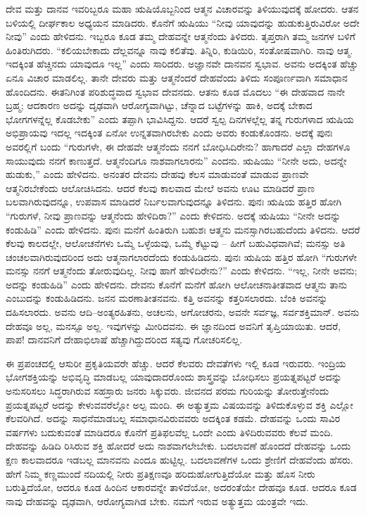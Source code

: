 ದೇವ ಮತ್ತು ದಾನವ ಇವರಿಬ್ಬರೂ ಮಹಾ ಋಷಿಯೊಬ್ಬನಿಂದ ಆತ್ಮನ ವಿಚಾರವನ್ನು ತಿಳಿಯುವುದಕ್ಕೆ ಹೋದರು. ಆತನ ಬಳಿಯಲ್ಲಿ ದೀರ್ಘಕಾಲ ಅಧ್ಯಯನ ಮಾಡಿದರು. ಕೊನೆಗೆ ಋಷಿಯು “ನೀವು ಯಾವುದನ್ನು ಹುಡುಕುತ್ತಿರುವಿರೋ ಅದೇ ನೀವು” ಎಂದು ಹೇಳಿದನು. ಇಬ್ಬರೂ ಕೂಡ ತಮ್ಮ ದೇಹವನ್ನೇ ಆತ್ಮನೆಂದು ತಿಳಿದರು. ತೃಪ್ತರಾಗಿ ತಮ್ಮ ಜನಗಳ ಬಳಿಗೆ ಹಿಂತಿರುಗಿದರು. “ಕಲಿಯಬೇಕಾದು ದೆಲ್ಲವನ್ನೂ ನಾವು ಕಲಿತೆವು. ತಿನ್ನಿರಿ, ಕುಡಿಯಿರಿ, ಸಂತೋಷವಾಗಿರಿ. ನಾವು ಆತ್ಮ. ಇದಕ್ಕಿಂತ ಹೆಚ್ಚಿನದು ಯಾವುದೂ ಇಲ್ಲ” ಎಂದು ಸಾರಿದರು. ಅಜ್ಞಾನವೇ ದಾನವನ ಸ್ವಭಾವ. ಅವನು ಅದಕ್ಕಿಂತ ಹೆಚ್ಚು ಏನೂ ವಿಚಾರ ಮಾಡಲಿಲ್ಲ. ತಾನೇ ದೇವರು ಮತ್ತು ಆತ್ಮನೆಂದರೆ ದೇಹವೆಂದು ತಿಳಿದು ಸಂಪೂರ್ಣವಾಗಿ ಸಮಾಧಾನ ಹೊಂದಿದನು. ಈತನಿಗಿಂತ ಪರಿಶುದ್ಧವಾದ ಸ್ವಭಾವ ದೇವನದು. ಆತನು ಕೂಡ ಮೊದಲು “ಈ ದೇಹವಾದ ನಾನೇ ಬ್ರಹ್ಮ; ಆದಕಾರಣ ಅದನ್ನು ದೃಢವಾಗಿ ಆರೋಗ್ಯವಾಗಿಟ್ಟು, ಚೆನ್ನಾದ ಬಟ್ಟೆಗಳನ್ನು ಹಾಕಿ, ಅದಕ್ಕೆ ಬೇಕಾದ ಭೋಗಗಳನ್ನೆಲ್ಲ ಕೊಡಬೇಕು” ಎಂದು ತಪ್ಪಾಗಿ ಭಾವಿಸಿದ್ದನು. ಆದರೆ ಸ್ವಲ್ಪ ದಿನಗಳಲ್ಲೆಲ್ಲ ತನ್ನ ಗುರುಗಳಾದ ಋಷಿಯ ಅಭಿಪ್ರಾಯವು ಇದಲ್ಲ ಇದಕ್ಕಿಂತ ಏನೋ ಉನ್ನತವಾಗಿರಬೇಕು ಎಂದು ಅವರು ಕಂಡುಕೊಂಡನು. ಅದಕ್ಕೆ ಪುನಃ ಅವರಲ್ಲಿಗೆ ಬಂದು “ಗುರುಗಳೇ, ಈ ದೇಹವೇ ಆತ್ಮನೆಂದು ನನಗೆ ಬೋಧಿಸಿದಿರೇನು? ಹಾಗಾದರೆ ಎಲ್ಲಾ ದೇಹಗಳೂ ಸಾಯುವುದು ನನಗೆ ಕಾಣುತ್ತದೆ. ಆತ್ಮನೆಂದಿಗೂ ನಾಶವಾಗಲಾರನು” ಎಂದನು. ಋಷಿಯು “ನೀನೇ ಅದು, ಅದನ್ನೇ ಹುಡುಕು,” ಎಂದು ಹೇಳಿದನು. ಅನಂತರ ದೇವನು ದೇಹವು ಕೆಲಸ ಮಾಡುವಂತೆ ಮಾಡುವ ಪ್ರಾಣವೇ ಆತ್ಮನಿರಬೇಕೆಂದು ಆಲೋಚಿಸಿದನು. ಆದರೆ ಕೆಲವು ಕಾಲವಾದ ಮೇಲೆ ಅವನು ಊಟ ಮಾಡಿದರೆ ಪ್ರಾಣ ಬಲವಾಗಿರುವುದನ್ನೂ, ಉಪವಾಸ ಮಾಡಿದರೆ ನಿರ್ಬಲವಾಗುವುದನ್ನೂ ತಿಳಿದನು. ಪುನಃ ಋಷಿಯ ಹತ್ತಿರ ಹೋಗಿ “ಗುರುಗಳೆ, ನೀವು ಪ್ರಾಣವನ್ನು ಆತ್ಮನೆಂದು ಹೇಳಿದಿರಾ?” ಎಂದು ಕೇಳಿದನು. ಅದಕ್ಕೆ ಋಷಿಯು “ನೀನೇ ಅದನ್ನು ಕಂಡುಹಿಡಿ” ಎಂದು ಹೇಳಿದನು. ಪುನಃ ಮನೆಗೆ ಹಿಂತಿರುಗಿ ಬಹುಶಃ ಆತ್ಮನು ಮನಸ್ಸಾಗಿರಬಹುದೆಂದು ತಿಳಿದನು. ಆದರೆ ಕೆಲವು ಕಾಲದಲ್ಲೇ, ಆಲೋಚನೆಗಳು ಒಮ್ಮೆ ಒಳ್ಳೆಯವು, ಒಮ್ಮೆ ಕೆಟ್ಟುವು – ಹೀಗೆ ಬಹುವಿಧವಾಗಿವೆ; ಮನಸ್ಸು ಅತಿ ಚಂಚಲವಾಗಿರುವುದರಿಂದ ಅದು ಆತ್ಮನಾಗಲಾರದೆಂದು ಕಂಡುಹಿಡಿದನು. ಪುನಃ ಋಷಿಯ ಹತ್ತಿರ ಹೋಗಿ “ಗುರುಗಳೇ ಮನಸ್ಸು ನನಗೆ ಆತ್ಮನೆಂದು ತೋರುವುದಿಲ್ಲ. ನೀವು ಹಾಗೆ ಹೇಳಿದಿರೇನು?” ಎಂದು ಕೇಳಿದನು. “ಇಲ್ಲ, ನೀನೇ ಅವನು; ಅದನ್ನು ಕಂಡುಹಿಡಿ” ಎಂದು ಹೇಳಿದನು. ದೇವನು ಕೊನೆಗೆ ಮನೆಗೆ ಹೋಗಿ ಆಲೋಚನಾತೀತವಾದ ಆತ್ಮನು ತಾನು ಎಂಬುದನ್ನು ಕಂಡುಹಿಡಿದನು. ಜನನ ಮರಣಾತೀತನವನು. ಕತ್ತಿ ಅವನನ್ನು ಕತ್ತರಿಸಲಾರದು. ಬೆಂಕಿ ಅವನನ್ನು ದಹಿಸಲಾರದು. ಅವನು ಆದಿ–ಅಂತ್ಯರಹಿತನು, ಅಚಲನು, ಅಗೋಚರನು, ಅವನೇ ಸರ್ವಜ್ಞ, ಸರ್ವಶಕ್ತಿಮಾನ್​. ಅವನು ದೇಹವೂ ಅಲ್ಲ, ಮನಸ್ಸೂ ಅಲ್ಲ. ಇವುಗಳನ್ನು ಮೀರಿದವನು. ಈ ಜ್ಞಾನದಿಂದ ಅವನಿಗೆ ತೃಪ್ತಿಯಾಯಿತು. ಆದರೆ, ಪಾಪ! ದಾನವನಿಗೆ ದೇಹಾಭಿಲಾಷೆ ಹೆಚ್ಚಾಗಿದ್ದುದರಿಂದ ಸತ್ಯವು ಗೋಚರಿಸಲಿಲ್ಲ.

ಈ ಪ್ರಪಂಚದಲ್ಲಿ ಆಸುರೀ ಪ್ರಕೃತಿಯವರೇ ಹೆಚ್ಚು. ಆದರೆ ಕೆಲವರು ದೇವತೆಗಳು ಇಲ್ಲಿ ಕೂಡ ಇರುವರು. ಇಂದ್ರಿಯ ಭೋಗಶಕ್ತಿಯನ್ನು ಅಭಿವೃದ್ಧಿ ಮಾಡಬಲ್ಲ ಯಾವುದಾದರೊಂದು ಶಾಸ್ತ್ರವನ್ನು ಬೋಧಿಸಲು ಪ್ರಯತ್ನಪಟ್ಟರೆ ಅದನ್ನು ಅನುಸರಿಸಲು ಸಿದ್ಧರಾಗಿರುವ ಸಹಸ್ರಾರು ಜನರು ಸಿಕ್ಕುವರು. ಜೀವನದ ಪರಮ ಗುರಿಯನ್ನು ತೋರುತ್ತೇನೆಂದು ಪ್ರಯತ್ನಪಟ್ಟರೆ ಅದನ್ನು ಕೇಳುವವರೆಲ್ಲೋ ಅಲ್ಪ ಮಂದಿ. ಈ ಅತ್ಯುತ್ತಮ ವಿಷಯವನ್ನು ತಿಳಿದುಕೊಳ್ಳುವ ಶಕ್ತಿ ಎಲ್ಲೋ ಕೆಲವರಿಗಿದೆ. ಅದನ್ನು ಸಾಧನೆಮಾಡಬಲ್ಲ ಸಮಾಧಾನವಿರುವವರು ಅದಕ್ಕಿಂತ ಕಡಮೆ. ದೇಹವನ್ನು ಒಂದು ಸಾವಿರ ವರ್ಷಗಳು ಬದುಕುವಂತೆ ಮಾಡಿದರೂ ಕೊನೆಗೆ ಪ್ರತಿಫಲವೆಲ್ಲ ಒಂದೇ ಎಂದು ತಿಳಿದಿರುವವರು ಕೆಲವೆ ಮಂದಿ. ದೇಹವನ್ನು ಹಿಡಿದಿ ರಿಸಿರುವ ಶಕ್ತಿ ಹೋದರೆ ಅದು ನಾಶವಾಗಲೇಬೇಕು. ಬದಲಾವಣೆ ಹೊಂದದೆ ದೇಹವನ್ನು ಒಂದು ಕ್ಷಣ ಕಾಲವಾದರೂ ಇಡಬಲ್ಲ ಮಾನವನು ಎಂದೂ ಹುಟ್ಟಿಲ್ಲ. ಬದಲಾವಣೆಗಳ ಒಂದು ಶ್ರೇಣಿಗೆ ದೇಹವೆಂದು ಹೆಸರು. ಹೇಗೆ ನಿಮ್ಮ ಕಣ್ಣಮುಂದೆ ನದಿಯಲ್ಲಿ ನೀರು ಪ್ರತಿಕ್ಷಣವೂ ಹರಿದುಹೋಗುತ್ತಿದೆಯೋ ಮತ್ತು ಹೊಸ ನೀರು ಬರುತ್ತಿದೆಯೋ, ಆದರೂ ಕೂಡ ಹಿಂದಿನ ಆಕಾರವನ್ನೇ ತಾಳಿದೆಯೋ, ಅದರಂತೆಯೇ ದೇಹವೂ ಕೂಡ. ಆದರೂ ಕೂಡ ನಾವು ದೇಹವನ್ನು ದೃಢವಾಗಿ, ಆರೋಗ್ಯವಾಗಿಡ ಬೇಕು. ನಮಗೆ ಇರುವ ಅತ್ಯುತ್ತಮ ಯಂತ್ರವೇ ಇದು. 

